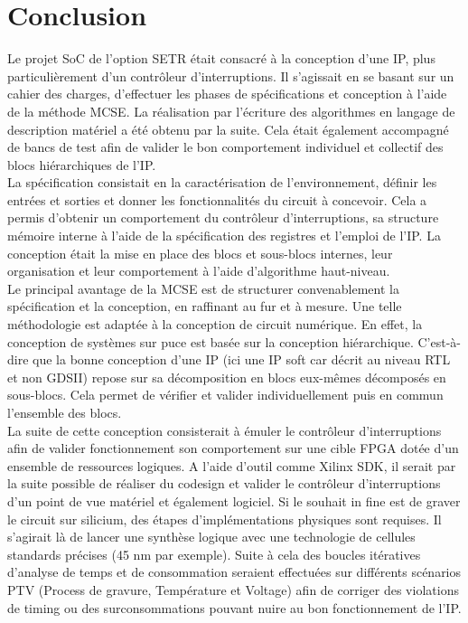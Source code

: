 \section{Conclusion}


Le projet SoC de l'option SETR était consacré à la conception d'une IP, plus particulièrement d'un contrôleur d'interruptions.
Il s'agissait en se basant sur un cahier des charges, d'effectuer les phases de spécifications et conception à l'aide de la méthode MCSE.
La réalisation par l'écriture des algorithmes en langage de description matériel a été obtenu par la suite.
Cela était également accompagné de bancs de test afin de valider le bon comportement individuel et collectif des blocs hiérarchiques de l'IP.\\

La spécification consistait en la caractérisation de l'environnement, définir les entrées et sorties et donner les fonctionnalités du circuit à concevoir.
Cela a permis d'obtenir un comportement du contrôleur d'interruptions, sa structure mémoire interne à l'aide de la spécification des registres et l'emploi de l'IP.
La conception était la mise en place des blocs et sous-blocs internes, leur organisation et leur comportement à l'aide d'algorithme haut-niveau.\\

Le principal avantage de la MCSE est de structurer convenablement la spécification et la conception, en raffinant au fur et à mesure.
Une telle méthodologie est adaptée à la conception de circuit numérique.
En effet, la conception de systèmes sur puce est basée sur la conception hiérarchique.
C'est-à-dire que la bonne conception d'une IP (ici une IP soft car décrit au niveau RTL et non GDSII) repose sur sa décomposition en blocs eux-mêmes décomposés en sous-blocs.
Cela permet de vérifier et valider individuellement puis en commun l'ensemble des blocs.\\

La suite de cette conception consisterait à émuler le contrôleur d'interruptions afin de valider fonctionnement son comportement sur une cible FPGA dotée d'un ensemble de ressources logiques.
A l'aide d'outil comme Xilinx SDK, il serait par la suite possible de réaliser du codesign et valider le contrôleur d'interruptions d'un point de vue matériel et également logiciel.
Si le souhait in fine est de graver le circuit sur silicium, des étapes d'implémentations physiques sont requises.
Il s'agirait là de lancer une synthèse logique avec une technologie de cellules standards précises (45 nm par exemple).
Suite à cela des boucles itératives d'analyse de temps et de consommation seraient effectuées sur différents scénarios PTV (Process de gravure, Température et Voltage) afin de corriger des violations de timing ou des surconsommations pouvant nuire au bon fonctionnement de l'IP.




